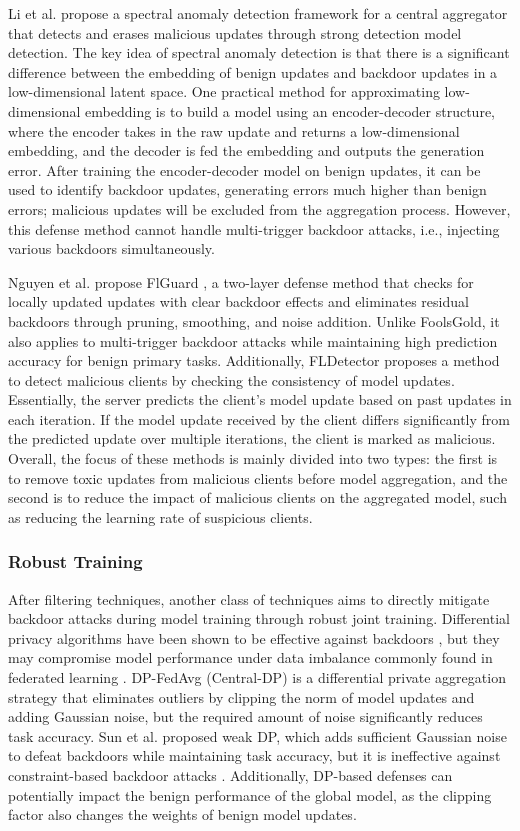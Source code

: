 \documentclass[conference]{IEEEtran}
\begin{document}
Li et al. \cite{b79} propose a spectral anomaly detection framework for a
central aggregator that detects and erases malicious updates through strong detection model detection.
The key idea of spectral anomaly detection is that there is a significant difference between the embedding
of benign updates and backdoor updates in a low-dimensional latent space. One practical method for approximating
low-dimensional embedding is to build a model using an encoder-decoder structure, where the encoder takes
in the raw update and returns a low-dimensional embedding, and the decoder is fed the embedding and outputs
the generation error.  After training the encoder-decoder model on benign updates, it can be used to identify
backdoor updates, generating errors much higher than benign errors; malicious updates will be excluded from
the aggregation process. However, this defense method cannot handle multi-trigger backdoor attacks, i.e.,
injecting various backdoors simultaneously.

Nguyen et al. propose FlGuard \cite{b80}, a two-layer defense method that checks
for locally updated updates with clear backdoor effects and eliminates residual backdoors through pruning, smoothing, and noise
addition. Unlike FoolsGold\cite{b78}, it also applies to multi-trigger backdoor attacks while maintaining high prediction accuracy for benign primary tasks.
Additionally, FLDetector \cite{b81} proposes a method to detect malicious clients by checking the consistency of model updates. Essentially,
the server predicts the client's model update based on past updates in each iteration. If the model update received by the client
differs significantly from the predicted update over multiple iterations, the client is marked as malicious. Overall, the focus of
these methods is mainly divided into two types: the first is to remove toxic updates from malicious clients before model aggregation,
and the second is to reduce the impact of malicious clients on the aggregated model, such as reducing the learning rate of suspicious clients.

\subsubsection{Robust Training}
After filtering techniques, another class of techniques aims to directly mitigate backdoor attacks during model training through robust joint training.
Differential privacy algorithms have been shown to be effective against backdoors \cite{b82}, but they may compromise model performance under data imbalance
commonly found in federated learning \cite{b83}. DP-FedAvg \cite{b84} (Central-DP) is a differential private aggregation strategy that eliminates
outliers by clipping the norm of model updates and adding Gaussian noise, but the required amount of noise significantly reduces
task accuracy. Sun et al. \cite{b27} proposed weak DP, which adds sufficient Gaussian noise to defeat backdoors while maintaining task accuracy,
but it is ineffective against constraint-based backdoor attacks \cite{b25}.
Additionally, DP-based defenses can potentially impact the benign performance of the global model,
as the clipping factor also changes the weights of benign model updates.
\end{document}
